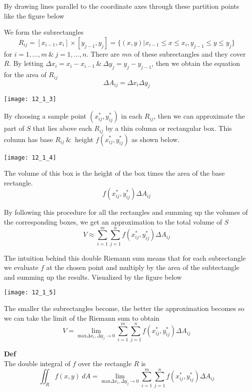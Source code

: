 \documentclass{article}
\begin{document}
  By drawing lines parallel to the coordinate axes through these partition points like the figure below

  We form the subrectangles
  \[
    R_{ij}= [x_{i-1},x_i] \times [y_{j-1},y_j] = \{ (x,y) | x_{i-1} \le x \le x_{i}, y_{j-1} \le y \le y_j \}
  \]
  for $ i=1,...,m ~\&~ j=1,...,n$. There are $ mn $ of these subrectangles and they cover $ R $. By letting $ \Delta x_i = x_i - x_{i-1} ~\&~ \Delta y_j = y_j - y_{j-1}$, then we obtain the equation for the area of $ R_{ij} $
  \[
    \Delta A_{ij}= \Delta x_{i} \Delta y_{j}
  \]

  \begin{center}
    \texttt{[image: 12\_1\_3]}
  \end{center}

  By choosing a sample point $ (x^{*}_{ij}, y^{*}_{ij}) $ in each $ R_{ij} $, then we can approximate the part of $ S $ that lies above each $ R_{ij} $ by a thin column or rectangular box. This column has base $ R_{ij} ~\&~ $ height $ f(x^{*}_{ij}, y^{*}_{ij}) $ as shown below.  

  \begin{center}
    \texttt{[image: 12\_1\_4]}
  \end{center}

  The volume of this box is the height of the box times the area of the base rectangle.
  \[
    f(x^{*}_{ij},y^{*}_{ij}) \Delta A_{ij}
  \]

  By following this procedure for all the rectangles and summing up the volumes of the corresponding boxes, we get an approximation to the total volume of $ S $
  \[
    V \approx \sum^{m}_{i=1} \sum^{n}_{j=1} f(x^{*}_{ij},y^{*}_{ij}) \Delta A_{ij}
  \]
  
  The intuition behind this double Riemann sum means that for each subrectangle we evaluate $ f $ at the chosen point and multiply by the area of the subtectangle and summing up the results. Visualized by the figure below
  \begin{center}
    \texttt{[image: 12\_1\_5]}
  \end{center}

  The smaller the subrectangles become, the better the approximation becomes so we can take the limit of the Riemann sum to obtain
  \[
    V = \lim_{\text{max}\Delta x_i, \Delta y_j \to 0}  \sum^{m}_{i=1} \sum^{n}_{j=1} f(x^{*}_{ij},y^{*}_{ij}) \Delta A_{ij}
  \]
 
  \textbf{Def}\\
  The double integral of $ f $ over the rectangle $ R $ is
  \[
    \iint_R f(x,y)~ dA = \lim_{\text{max}\Delta x_i, \Delta y_j \to 0}  \sum^{m}_{i=1} \sum^{n}_{j=1} f(x^{*}_{ij},y^{*}_{ij}) \Delta A_{ij}
  \]
\end{document}
